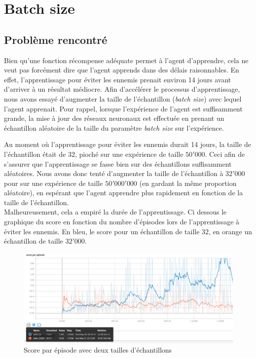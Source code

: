 \documentclass[11pt,a4paper]{report}
\begin{document}
   \section{Batch size}
   
   \subsection{Problème rencontré}
   
   \par Bien qu'une fonction récompense adéquate permet à l'agent d'apprendre, cela ne veut pas forcément dire que l'agent apprends dans des délais raisonnables. En effet, l'apprentissage pour éviter les ennemis prenait environ 14 jours avant d'arriver à un résultat médiocre. Afin d'accélérer le processus d'apprentissage, nous avons essayé d'augmenter la taille de l'échantillon (\textit{batch size}) avec lequel l'agent apprenait. Pour rappel, lorsque l’expérience de l'agent est suffisamment grande, la mise à jour des réseaux neuronaux est effectuée en prenant un échantillon aléatoire de la taille du paramètre \textit{batch size} sur l'expérience. 
   
   \par Au moment où l'apprentissage pour éviter les ennemis durait 14 jours, la taille de l'échantillon était de $32$, pioché sur une expérience de taille $50'000$. Ceci afin de s'assurer que l'apprentissage se fasse bien sur des échantillons suffisamment aléatoires. Nous avons donc tenté d'augmenter la taille de l'échantillon à $32'000$ pour sur une expérience de taille $50'000'000$ (en gardant la même proportion aléatoire), en espérant que l'agent apprendre plus rapidement en fonction de la taille de l'échantillon. \\
   Malheureusement, cela a empiré la durée de l'apprentissage. Ci dessous le graphique du score en fonction du nombre d'épisodes lors de l'apprentissage à éviter les ennemis. En bleu, le score pour un échantillon de taille $32$, en orange un échantillon de taille $32'000$.
   
   \begin{figure}[!h]
   \center
   \includegraphics[scale=0.4]{ressources/batch_size.png}
   \caption{Score par épisode avec deux tailles d'échantillons}
   \end{figure} 
   
\end{document}
